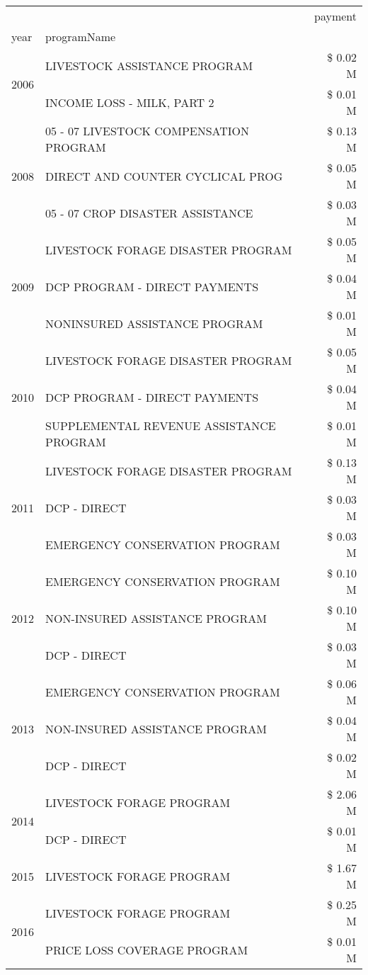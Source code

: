 \begin{tabular}{llr}
\toprule
 &  & payment \\
year & programName &  \\
\midrule
\multirow[t]{2}{*}{2006} & LIVESTOCK ASSISTANCE PROGRAM & \$ 0.02 M \\
 & INCOME LOSS - MILK, PART 2 & \$ 0.01 M \\
\cline{1-3}
\multirow[t]{3}{*}{2008} & 05 - 07 LIVESTOCK COMPENSATION PROGRAM & \$ 0.13 M \\
 & DIRECT AND COUNTER CYCLICAL PROG & \$ 0.05 M \\
 & 05 - 07 CROP DISASTER ASSISTANCE & \$ 0.03 M \\
\cline{1-3}
\multirow[t]{3}{*}{2009} & LIVESTOCK FORAGE DISASTER  PROGRAM & \$ 0.05 M \\
 & DCP PROGRAM - DIRECT PAYMENTS & \$ 0.04 M \\
 & NONINSURED ASSISTANCE PROGRAM & \$ 0.01 M \\
\cline{1-3}
\multirow[t]{3}{*}{2010} & LIVESTOCK FORAGE DISASTER  PROGRAM & \$ 0.05 M \\
 & DCP PROGRAM - DIRECT PAYMENTS & \$ 0.04 M \\
 & SUPPLEMENTAL REVENUE ASSISTANCE PROGRAM & \$ 0.01 M \\
\cline{1-3}
\multirow[t]{3}{*}{2011} & LIVESTOCK FORAGE DISASTER PROGRAM & \$ 0.13 M \\
 & DCP - DIRECT & \$ 0.03 M \\
 & EMERGENCY CONSERVATION PROGRAM & \$ 0.03 M \\
\cline{1-3}
\multirow[t]{3}{*}{2012} & EMERGENCY CONSERVATION PROGRAM & \$ 0.10 M \\
 & NON-INSURED ASSISTANCE PROGRAM & \$ 0.10 M \\
 & DCP - DIRECT & \$ 0.03 M \\
\cline{1-3}
\multirow[t]{3}{*}{2013} & EMERGENCY CONSERVATION PROGRAM & \$ 0.06 M \\
 & NON-INSURED ASSISTANCE PROGRAM & \$ 0.04 M \\
 & DCP - DIRECT & \$ 0.02 M \\
\cline{1-3}
\multirow[t]{2}{*}{2014} & LIVESTOCK FORAGE PROGRAM & \$ 2.06 M \\
 & DCP - DIRECT & \$ 0.01 M \\
\cline{1-3}
2015 & LIVESTOCK FORAGE PROGRAM & \$ 1.67 M \\
\cline{1-3}
\multirow[t]{3}{*}{2016} & LIVESTOCK FORAGE PROGRAM & \$ 0.25 M \\
 & PRICE LOSS COVERAGE PROGRAM & \$ 0.01 M \\

\end{tabular}
